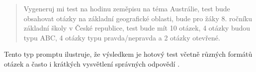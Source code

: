\documentclass{report}%
\begin{document}
\begin{enumerate}
\begin{enumerate}
\begin{quote}
\begin{PromptBlock}


Vygeneruj mi test na hodinu zeměpisu na téma Austrálie, test bude obsahovat otázky na základní geografické oblasti, bude pro žáky 8. ročníku základní školy v České republice, test bude mít 10 otázek, 4 otázky budou typu ABC, 4 otázky typu pravda/nepravda a 2 otázky otevřené.
\end{PromptBlock}


        \end{quote}
        Tento typ promptu ilustruje, že výsledkem je hotový test včetně různých formátů otázek a často i krátkých vysvětlení správných odpovědí \cite{kb_ai_101_tipu_pdf_04e4a115_page_36_1}.
    \end{enumerate}
\end{enumerate}
\end{document}
